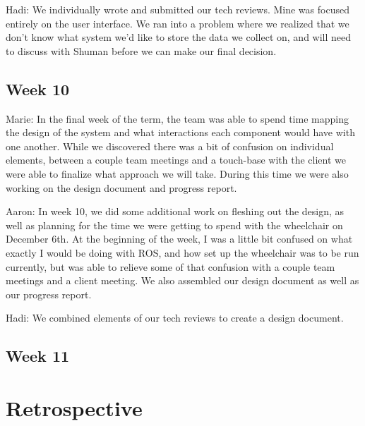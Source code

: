 \documentclass[onecolumn, draftclsnofoot,10pt, compsoc]{IEEEtran}
\begin{document}
Hadi: We individually wrote and submitted our tech reviews. Mine was focused entirely on the user interface. We ran into a problem where we realized that we don't know what system we'd like to store the data we collect on, and will need to discuss with Shuman before we can make our final decision.\par

\subsection{Week 10}
Marie: In the final week of the term, the team was able to spend time mapping the design of the system and what interactions each component would have with one another. While we discovered there was a bit of confusion on individual elements, between a couple team meetings and a touch-base with the client we were able to finalize what approach we will take. During this time we were also working on the design document and progress report.\par

Aaron: In week 10, we did some additional work on fleshing out the design, as well as planning for the time we were getting to spend with the wheelchair on December 6th. At the beginning of the week, I was a little bit confused on what exactly I would be doing with ROS, and how set up the wheelchair was to be run currently, but was able to relieve some of that confusion with a couple team meetings and a client meeting. We also assembled our design document as well as our progress report.\par

Hadi: We combined elements of our tech reviews to create a design document.\par

\subsection{Week 11}

\section{Retrospective}
\end{document}
